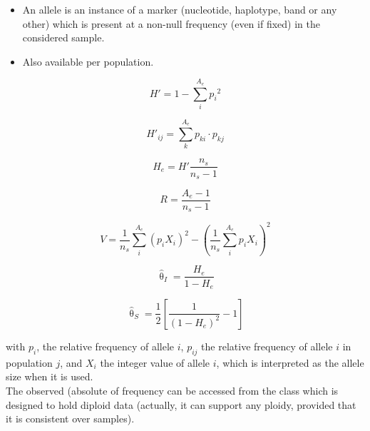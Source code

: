 \documentclass{scrartcl}
\newcommand{\cpp}[1]{{\color{blue}{\texttt{#1}}}}
\begin{document}
\begin{itemize}
    \item[\dag] An allele is an instance of a marker (nucleotide,
        haplotype, band or any other) which is present at a non-null
        frequency (even if fixed) in the considered sample.
    \item[\ddag] Also available per population.
\end{itemize}

\begin{displaymath}
    H' = 1 - \sum_i^{A_e} {p_i}^2
\end{displaymath}

\begin{displaymath}
    H'_{ij} = \sum_k^{A_e} p_{ki} \cdot p_{kj}
\end{displaymath}

\begin{displaymath}
    H_e = H' \frac{n_s}{n_s-1}
\end{displaymath}

\begin{displaymath}
    R = \frac{A_e-1}{n_s-1}
\end{displaymath}

\begin{displaymath}
    V = \frac{1}{n_s} \sum_i^{A_e} \left( p_i X_i \right)^2 - \left( \frac{1}{n_s} \sum_i^{A_e} p_i X_i \right)^2
\end{displaymath}

\begin{displaymath}
    \hat{\uptheta}_I = \frac{H_e}{1-H_e}
\end{displaymath}

\begin{displaymath}
    \hat{\uptheta}_S = \frac{1}{2} \left[ \frac{1}{\left( 1-H_e \right)^2} - 1 \right]
\end{displaymath}

with $p_i$, the relative frequency of allele $i$, $p_{ij}$ the relative
frequency of allele $i$ in population $j$, and $X_i$ the integer value
of allele $i$, which is interpreted as the allele size when it is used. \\

\noindent
The observed (absolute of frequency can be accessed from the class
\cpp{GenoFreq} which is designed to hold diploid data (actually, it
can support any ploidy, provided that it is consistent over samples). \\
\end{document}
